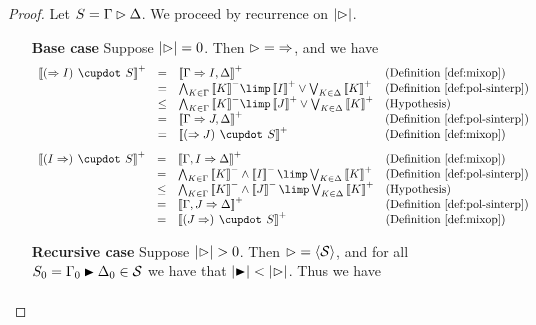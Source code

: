 \begin{proof}
  Let $S = \Gamma \J \Delta$. We proceed by recurrence on $\bradepth{\J}$.
  \begin{itemize}
    \item[\textbf{Base case}] Suppose $\bradepth{\J} = 0$. Then $\J = {\seq}$,
    and we have
    $$
    \begin{array}{rcll}
      \psint{(\seq I) \mix S}
      &=& \psint{\Gamma \seq I, \Delta} &\text{(\refdef{mixop})}\\
      &=& \bigwedge_{K \in \Gamma}{\nsint{K}} \limp \psint{I} \lor \bigvee_{K \in \Delta}{\psint{K}} &\text{(\refdef{pol-sinterp})}\\
      &\sement& \bigwedge_{K \in \Gamma}{\nsint{K}} \limp \psint{J} \lor \bigvee_{K \in \Delta}{\psint{K}} &\text{(Hypothesis)}\\
      &=& \psint{\Gamma \seq J, \Delta} &\text{(\refdef{pol-sinterp})}\\
      &=& \psint{(\seq J) \mix S} &\text{(\refdef{mixop})}
    \end{array}
    $$
    $$
    \begin{array}{rcll}
      \psint{(I \seq) \mix S}
      &=& \psint{\Gamma, I \seq \Delta} &\text{(\refdef{mixop})}\\
      &=& \bigwedge_{K \in \Gamma}{\nsint{K}} \land \nsint{I} \limp \bigvee_{K \in \Delta}{\psint{K}} &\text{(\refdef{pol-sinterp})}\\
      &\sement& \bigwedge_{K \in \Gamma}{\nsint{K}} \land \nsint{J} \limp \bigvee_{K \in \Delta}{\psint{K}} &\text{(Hypothesis)} \\
      &=& \psint{\Gamma, J \seq \Delta} &\text{(\refdef{pol-sinterp})}\\
      &=& \psint{(J \seq) \mix S} &\text{(\refdef{mixop})}
    \end{array}
    $$
    \item[\textbf{Recursive case}] Suppose $\bradepth{\J} > 0$. Then $\J =
    {\piq{\mathcal{S}}}$, and for all $S_0 = \Gamma_0 \JB \Delta_0 \in
    \mathcal{S}$ we have that $\bradepth{\JB} < \bradepth{\J}$. Thus we have
    $$
    \begin{array}{rcll}

\end{array}$$
\end{itemize}
\end{proof}
